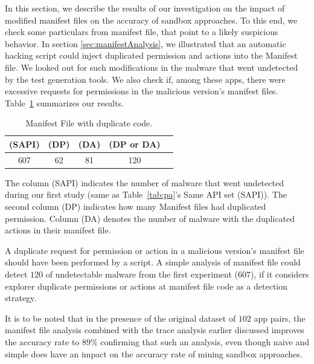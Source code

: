 In this section, we describe the results of our investigation on the impact of modified manifest files on the accuracy of sandbox approaches. 
To this end, we check some particulars from manifest file, that point to a likely suspicious behavior. In section \ref{sec:manifestAnalysis}, we illustrated that an automatic hacking script could inject duplicated permission and actions into the Manifest file. We looked out for such modifications in the malware that went undetected by the test generation tools. We also check if, among these apps, there were excessive requests for permissions in the malicious version's manifest files. Table~\ref{tab:mfa} summarizes our results. 

\begin{table}[ht]
  \caption{Manifest File with duplicate code.}
  \centering
  \begin{small}
 \begin{tabular}{ccccc}
   \toprule
   (SAPI) & (DP) & (DA) & (DP or DA) \\   \midrule
   607 & 62 & 81 & 120 \\ 
   
 \bottomrule
 \end{tabular}
 \end{small}
 \label{tab:mfa}
\end{table}

The column (SAPI) indicates the number of malware that went undetected during our first study (same as Table~\ref{tab:pa}'s Same API set (SAPI)). The second column (DP) indicates how many Manifest files had duplicated permission. Column (DA) denotes the number of malware with the duplicated actions in their manifest file.

A duplicate request for permission or action in a malicious version's manifest file should have been performed by a script. A simple analysis of manifest file could detect $120$ of undetectable malware from the first experiment ($607$), if it considers explorer duplicate permissions or actions at manifest file code as a detection strategy.

It is to be noted that in the presence of the original dataset of $102$ app pairs, the manifest file analysis combined with the trace analysis earlier discussed improves the accuracy rate to $89\%$ confirming that such an analysis, even though naive and simple does have an impact on the accuracy rate of mining sandbox approaches.  


